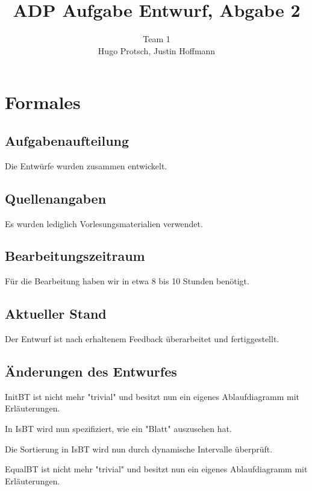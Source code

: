 \documentclass[11pt]{article}
\title{ADP Aufgabe Entwurf, Abgabe 2}
\author{Team 1\\Hugo Protsch, Justin Hoffmann}
\begin{document}
    \maketitle


    \section{Formales}\label{sec:Formales}


    \subsection{Aufgabenaufteilung}
    Die Entwürfe wurden zusammen entwickelt.

    \subsection{Quellenangaben}
    
    Es wurden lediglich Vorlesungsmaterialien verwendet.


    \subsection{Bearbeitungszeitraum}
    Für die Bearbeitung haben wir in etwa 8 bis 10 Stunden benötigt.

    \subsection{Aktueller Stand}
    Der Entwurf ist nach erhaltenem Feedback überarbeitet und fertiggestellt.


    \subsection{Änderungen des Entwurfes}
    InitBT ist nicht mehr "trivial" und besitzt nun ein eigenes Ablaufdiagramm mit Erläuterungen.
    
    In IsBT wird nun spezifiziert, wie ein "Blatt" auszusehen hat.
    
    Die Sortierung in IsBT wird nun durch dynamische Intervalle überprüft.
    
    EqualBT ist nicht mehr "trivial" und besitzt  nun ein eigenes Ablaufdiagramm mit Erläuterungen.
    
\end{document}
